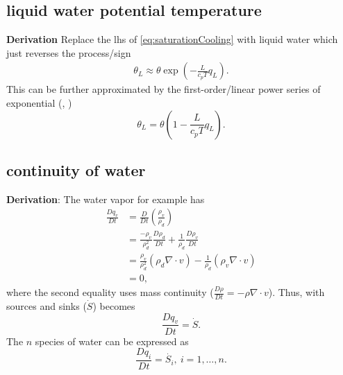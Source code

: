 \subsection{liquid water potential temperature}
{\bf Derivation} Replace the lhs of \eqref{eq:saturationCooling} with liquid water which just
reverses the process/sign 
\begin{equation}
\begin{aligned}
   \boxed{\theta_L \approx \theta\exp(-\frac{L}{c_pT} q_{L})}.
\end{aligned}
\end{equation}
This can be further approximated by the first-order/linear power series of
exponential (\cite{betts1973non}, \cite{grenier2001moist})
\begin{equation}
   \boxed{\theta_L = \theta(1 - \frac{L}{c_pT} q_{L})}.
\end{equation}

\subsection{continuity of water}
{\bf Derivation}: The water vapor for example has
\begin{equation}
\begin{aligned}
   \frac{D q_v}{D t} & = \frac{D}{D t} (\frac{\rho_v}{\rho_d}) \\
        & = \frac{-\rho_v}{\rho_d^2} \frac{D \rho_d}{D t} + \frac{1}{\rho_d}\frac{D \rho_v}{D t} \\
        & = \frac{\rho_v}{\rho_d^2}(\rho_d \nabla \cdot v) - \frac{1}{\rho_d}(\rho_v \nabla \cdot v) \\
        & = 0,
\end{aligned}
\end{equation}
where the second equality uses mass continuity ($\frac{D \rho}{D t} = -\rho \nabla\cdot v$). Thus,
with sources and sinks ($\dot{S}$) becomes
\begin{equation}
   \frac{D q_v}{D t} = \dot{S}.
\end{equation}
The $n$ species of water can be expressed as
\begin{equation}\label{eq:cont_w}
   \boxed{\frac{D q_i}{D t} = \dot{S_i}, \ i=1,\dotsc,n}.
\end{equation}




